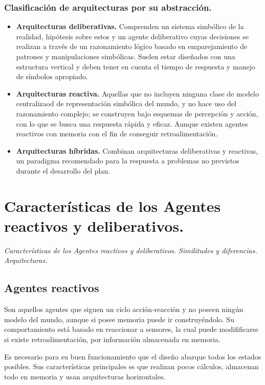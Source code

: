 \documentclass[12 pt, a4paper]{article}
\begin{document}
\subsubsection*{Clasificación de arquitecturas por su abstracción.}
\begin{itemize}
  \item \textbf{Arquitecturas deliberativas.} Comprenden un sistema simbólico de la realidad, hipótesis sobre estos y un agente deliberativo 
  cuyas decisiones se realizan a través de un razonamiento lógico basado en emparejamiento de patrones y manipulaciones simbólicas.
  Suelen estar diseñados con una estructura vertical y deben tener en cuenta el tiempo de respuesta y manejo de símbolos apropiado. 
  
  \item \textbf{Arquitecturas reactiva.} Aquellas que no incluyen ninguna clase de modelo centralizaod de representación
  simbólica del mundo, y no hace uso del razonamiento complejo; se construyen bajo esquemas de percepción y acción, con lo que se busca
  una respuesta rápida y eficaz. Aunque existen agentes reactivos con memoria con el fin de conseguir retroalimentación.  
  
  \item \textbf{Arquitecturas híbridas. } Combinan arquitecturas deliberativas y reactivas, un paradigma recomendado para la respuesta a problemas
  no previstos durante el desarrollo del plan. 
\end{itemize}


\newpage
\section{ Características de los Agentes reactivos y deliberativos.}
 \textit{Características de los Agentes reactivos y deliberativos. Similitudes y diferencias. Arquitecturas.}

\subsection{Agentes reactivos}
Son aquellos agentes que siguen un ciclo acción-reacción y no poseen ningún modelo del mundo, aunque si posee memoria puede ir
construyéndolo. Su comportamiento está basado en reaccionar a sensores, la cual puede modifificarse si existe retroalimentación, 
por información almacenada en memoria.

Es necesario para su buen funcionamiento que el diseño abarque todos los estados posibles. 
Sus características principales es que realizan pocos cálculos, almacenan todo en memoria y usan arquitecturas 
horizontales. 
\end{document}
